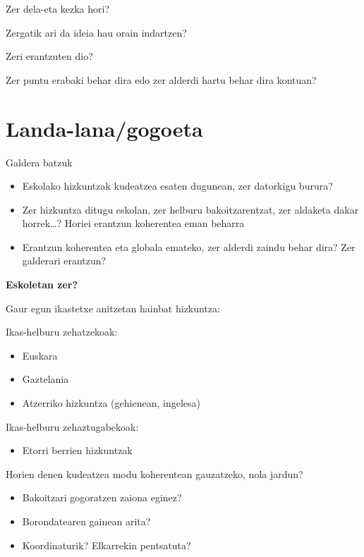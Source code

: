 \documentclass[
]{book}
\providecommand{\tightlist}{%
  \setlength{\itemsep}{0pt}\setlength{\parskip}{0pt}}
\begin{document}
Zer dela-eta kezka hori?

Zergatik ari da ideia hau orain indartzen?

Zeri erantzuten dio?

Zer puntu erabaki behar dira edo zer alderdi hartu behar dira kontuan?

\hypertarget{landa-lanagogoeta}{%
\section{Landa-lana/gogoeta}\label{landa-lanagogoeta}}

Galdera batzuk

\begin{itemize}
\tightlist
\item
  Eskolako hizkuntzak kudeatzea esaten dugunean, zer datorkigu burura?
\item
  Zer hizkuntza ditugu eskolan, zer helburu bakoitzarentzat, zer aldaketa dakar horrek\ldots? Horiei erantzun koherentea eman beharra
\item
  Erantzun koherentea eta globala emateko, zer alderdi zaindu behar dira? Zer galderari erantzun?
\end{itemize}

\textbf{Eskoletan zer?}

Gaur egun ikastetxe anitzetan hainbat hizkuntza:

Ikas-helburu zehatzekoak:

\begin{itemize}
\tightlist
\item
  Euskara
\item
  Gaztelania
\item
  Atzerriko hizkuntza (gehienean, ingelesa)
\end{itemize}

Ikas-helburu zehaztugabekoak:

\begin{itemize}
\tightlist
\item
  Etorri berrien hizkuntzak
\end{itemize}

Horien denen kudeatzea modu koherentean gauzatzeko, nola jardun?

\begin{itemize}
\tightlist
\item
  Bakoitzari gogoratzen zaiona eginez?
\item
  Borondatearen gainean arita?
\item
  Koordinaturik? Elkarrekin pentsatuta?
\end{itemize}
\end{document}
